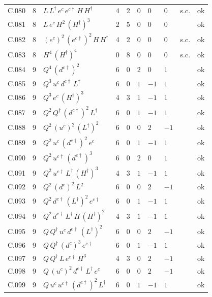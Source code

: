 {\begin{longtable}{@{}ll>{\raggedright\arraybackslash}p{6.4cm}rrllllr@{}}
C.080 & 8 & $L\,L^\dagger\,e^c\,e^{c\dagger}\,H\,H^\dagger$ & 4 & 2 & $0$ & $0$ & $0$ & s.c. & ok \\
C.081 & 8 & $L\,e^c\,H^{2}\,(H^\dagger)^{3}$ & 2 & 5 & $0$ & $0$ & $0$ &  & ok \\
C.082 & 8 & $(e^c)^{2}\,(e^{c\dagger})^{2}\,H\,H^\dagger$ & 4 & 2 & $0$ & $0$ & $0$ & s.c. & ok \\
C.083 & 8 & $H^{4}\,(H^\dagger)^{4}$ & 0 & 8 & $0$ & $0$ & $0$ & s.c. & ok \\
C.084 & 9 & $Q^{4}\,(d^{c\dagger})^{2}$ & 6 & 0 & $2$ & $0$ & $1$ &  & ok \\
C.085 & 9 & $Q^{3}\,u^c\,d^{c\dagger}\,L^\dagger$ & 6 & 0 & $1$ & $-1$ & $1$ &  & ok \\
C.086 & 9 & $Q^{3}\,e^c\,(H^\dagger)^{3}$ & 4 & 3 & $1$ & $-1$ & $1$ &  & ok \\
C.087 & 9 & $Q^{2}\,Q^\dagger\,(d^{c\dagger})^{2}\,L^\dagger$ & 6 & 0 & $1$ & $-1$ & $1$ &  & ok \\
C.088 & 9 & $Q^{2}\,(u^c)^{2}\,(L^\dagger)^{2}$ & 6 & 0 & $0$ & $2$ & $-1$ &  & ok \\
C.089 & 9 & $Q^{2}\,u^c\,(d^{c\dagger})^{2}\,e^c$ & 6 & 0 & $1$ & $-1$ & $1$ &  & ok \\
C.090 & 9 & $Q^{2}\,u^{c\dagger}\,(d^{c\dagger})^{3}$ & 6 & 0 & $2$ & $0$ & $1$ &  & ok \\
C.091 & 9 & $Q^{2}\,u^{c\dagger}\,L^\dagger\,(H^\dagger)^{3}$ & 4 & 3 & $1$ & $-1$ & $1$ &  & ok \\
C.092 & 9 & $Q^{2}\,(d^c)^{2}\,L^{2}$ & 6 & 0 & $0$ & $2$ & $-1$ &  & ok \\
C.093 & 9 & $Q^{2}\,d^{c\dagger}\,(L^\dagger)^{2}\,e^{c\dagger}$ & 6 & 0 & $1$ & $-1$ & $1$ &  & ok \\
C.094 & 9 & $Q^{2}\,d^{c\dagger}\,L^\dagger\,H\,(H^\dagger)^{2}$ & 4 & 3 & $1$ & $-1$ & $1$ &  & ok \\
C.095 & 9 & $Q\,Q^\dagger\,u^c\,d^{c\dagger}\,(L^\dagger)^{2}$ & 6 & 0 & $0$ & $2$ & $-1$ &  & ok \\
C.096 & 9 & $Q\,Q^\dagger\,(d^c)^{3}\,e^{c\dagger}$ & 6 & 0 & $1$ & $-1$ & $1$ &  & ok \\
C.097 & 9 & $Q\,Q^\dagger\,L\,e^{c\dagger}\,H^{3}$ & 4 & 3 & $0$ & $2$ & $-1$ &  & ok \\
C.098 & 9 & $Q\,(u^c)^{2}\,d^{c\dagger}\,L^\dagger\,e^c$ & 6 & 0 & $0$ & $2$ & $-1$ &  & ok \\
C.099 & 9 & $Q\,u^c\,u^{c\dagger}\,(d^{c\dagger})^{2}\,L^\dagger$ & 6 & 0 & $1$ & $-1$ & $1$ &  & ok \\

\end{longtable}}
